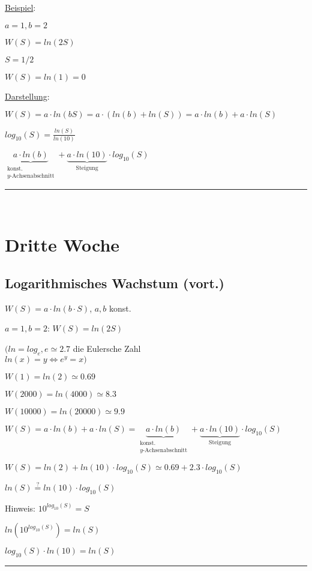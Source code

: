 \documentclass[18pt,a4paper]{scrreprt}
\begin{document}
\uline{Beispiel}:

$a =1, b=2$

$W(S) = ln(2S)$

$S = 1/2$

$W(S) = ln(1) = 0$

\uline{Darstellung}:

$W(S) = a\cdot ln(bS) = a\cdot (ln(b) + ln(S)) = a\cdot ln(b) + a\cdot ln(S)$

$log_{10}(S) = \frac{ln(S)}{ln(10)}$

$\underbrace{a\cdot ln(b)}_{\substack{\text{konst.}\\y\text{-Achsenabschnitt}}} + \underbrace{a\cdot ln(10)}_{\text{Steigung}} \cdot log_{10}(S)$

\rule{\textwidth}{0.4mm}\\

\chapter{Dritte Woche}

\section{Logarithmisches Wachstum (vort.)}

$W(S) = a \cdot ln(b\cdot S)$, $a,b$ konst.

$a = 1, b =2$: $W(S)= ln(2S)$

$(ln = log_e, e \simeq 2.7$ die Eulersche Zahl\\ $ln(x) = y \Leftrightarrow e^y = x)$

$W(1) = ln(2) \simeq 0.69$

$W(2000) = ln(4000) \simeq 8.3$

$W(10000) = ln(20000) \simeq 9.9$

$W(S) = a\cdot ln(b) + a\cdot ln(S) = \underbrace{a\cdot ln(b)}_{\substack{\text{konst.}\\y\text{-Achsenabschnitt}}} + \underbrace{a\cdot ln(10)}_{\text{Steigung}} \cdot log_{10}(S)$

$W(S) = ln(2) + ln(10) \cdot log_{10}(S) \simeq 0.69 + 2.3 \cdot log_{10}(S)$

$ln(S) \stackrel{?}{=} ln(10) \cdot log_{10}(S)$

Hinweis: $10^{log_{10}(S)} = S$

$ln(10^{log_{10}(S)}) = ln(S)$

$log_{10}(S) \cdot ln(10) = ln(S)$

\rule{\textwidth}{0.4mm}\\
\end{document}
